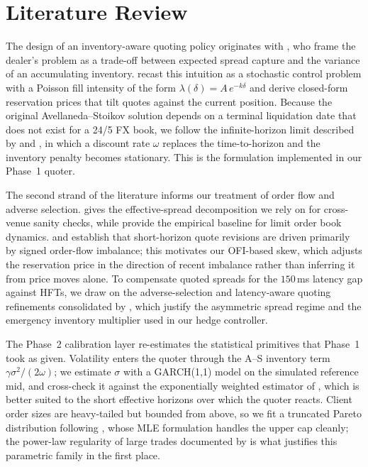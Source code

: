 \section{Literature Review}
\label{sec:literature}

The design of an inventory-aware quoting policy originates with
\citet{hostoll1981optimal}, who frame the dealer's problem as a trade-off
between expected spread capture and the variance of an accumulating
inventory. \citet{avellaneda2008high} recast this intuition as a stochastic
control problem with a Poisson fill intensity of the form
$\lambda(\delta) = A\,e^{-k\delta}$ and derive closed-form reservation
prices that tilt quotes against the current position. Because the original
Avellaneda--Stoikov solution depends on a terminal liquidation date that
does not exist for a 24/5 FX book, we follow the infinite-horizon limit
described by \citet{gueant2013dealing} and \citet{gueant2017optimal}, in
which a discount rate $\omega$ replaces the time-to-horizon and the
inventory penalty becomes stationary. This is the formulation implemented
in our Phase~1 quoter.

The second strand of the literature informs our treatment of order flow
and adverse selection. \citet{roll1984simple} gives the effective-spread
decomposition we rely on for cross-venue sanity checks, while
\citet{biais1995empirical} provide the empirical baseline for limit order
book dynamics. \citet{engle2004impacts} and \citet{cont2014price} establish
that short-horizon quote revisions are driven primarily by signed
order-flow imbalance; this motivates our OFI-based skew, which adjusts the
reservation price in the direction of recent imbalance rather than
inferring it from price moves alone. To compensate quoted spreads for the
$150$\,ms latency gap against HFTs, we draw on the adverse-selection and
latency-aware quoting refinements consolidated by
\citet{carteajaimungal2015algorithmic}, which justify the asymmetric
spread regime and the emergency inventory multiplier used in our hedge
controller.

The Phase~2 calibration layer re-estimates the statistical primitives that
Phase~1 took as given. Volatility enters the quoter through the A--S
inventory term $\gamma\sigma^{2}/(2\omega)$; we estimate $\sigma$ with a
GARCH(1,1) model \citep{bollerslev1986generalized} on the simulated
reference mid, and cross-check it against the exponentially weighted
estimator of \citet{riskmetrics1996}, which is better suited to the short
effective horizons over which the quoter reacts. Client order sizes are
heavy-tailed but bounded from above, so we fit a truncated Pareto
distribution following \citet{aban2006parameter}, whose MLE formulation
handles the upper cap cleanly; the power-law regularity of large trades
documented by \citet{gabaix2003theory} is what justifies this parametric
family in the first place.

